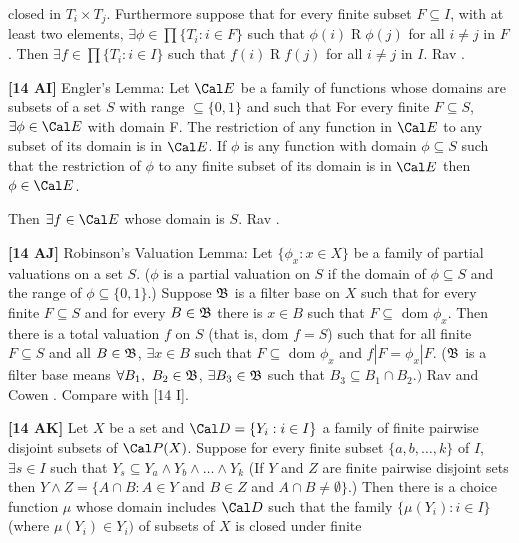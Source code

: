 closed in $T_i\times T_j$. Furthermore suppose that for every finite
subset $F\subseteq I$, with at least two elements, $\exists\phi\in\prod
\{T_i:i\in F\}$ such that $\phi(i)\mathrel R\phi(j)$ for all $i\neq j$
in $F$. Then $\exists f\in\prod\{T_i: i\in I\}$ such that $f(i)\mathrel
R f(j)$ for all $i\neq j$ in $I$. \ac{Rav} \cite{1977}.
\smallskip
\item{}{\bf [14 AI]}  Engler's Lemma: Let ${\Cal E}$ be a family of
functions  whose domains are subsets of a set $S$ with range $\subseteq
\{0,1\}$ and such that
 For every finite $F\subseteq S$, $\exists \phi \in {\Cal E}$
with domain F.
 The restriction of any function in ${\Cal E}$ to any subset
of its domain is in ${\Cal E}$.
If $\phi $ is any function with domain $\phi\subseteq S$  such
that  the restriction of $\phi $ to any finite subset of its domain is in
${\Cal E}$ then $\phi \in  {\Cal E}$.
\item{} Then $\exists f\in {\Cal E}$ whose domain is $S$.
\ac{Rav} \cite{1977}. 
\smallskip
\item{}{\bf [14 AJ]}  Robinson's Valuation Lemma: Let $\{\phi_{x}:
x\in X\}$ be a family of partial valuations on a set $S$. ($\phi$ is a
partial valuation on $S$ if the domain of $\phi\subseteq S$ and the
range of $\phi \subseteq  \{ 0,1\}$.)  Suppose $\frak B$ is a filter
base on $X$ such that for every finite $F\subseteq S$ and for
every $B\in\frak B$ there is $x\in B$ such that $F\subseteq$ dom
$\phi_{x}$. Then there is a total valuation $f$ on $S$ (that is, dom $f
= S$) such that for all finite $F\subseteq S$ and all $B\in\frak B$,
$\exists x\in B$ such that $F\subseteq$ dom $\phi_{x}$ and $f|F = \phi_x
|F$. ($\frak B$ is a filter base means $\forall B_{1},\ B_{2}\in\frak B$,
$\exists B_{3}\in\frak B$ such that $B_{3}\subseteq B_{1}\cap B_{2}.)$
\ac{Rav} \cite{1977} and \ac{Cowen} \cite{1973}.  Compare with [14 I].
\smallskip
\item{}{\bf [14 AK]}  Let $X$ be a set and ${\Cal D}=\{Y_{i}: i\in I\}$ a
family of finite pairwise disjoint subsets of ${\Cal P}(X)$.
Suppose for every finite subset $\{a, b,\ldots, k\}$ of $I$,
$\exists s\in I$ such that $Y_{s}\subseteq Y_{a}\land Y_{b}\land \ldots
\land Y_{k}$ (If $Y$ and $Z$ are finite pairwise disjoint sets then
$Y\land  Z = \{A\cap B: A\in Y$ and $B\in Z$ and
$A\cap B\neq\emptyset\}$.) Then there is a choice function $\mu$ whose
domain includes ${\Cal D}$ such that the family $\{\mu(Y_{i}): i\in I\}$
(where $\mu(Y_{i})\in Y_{i})$ of subsets of $X$ is closed under finite
